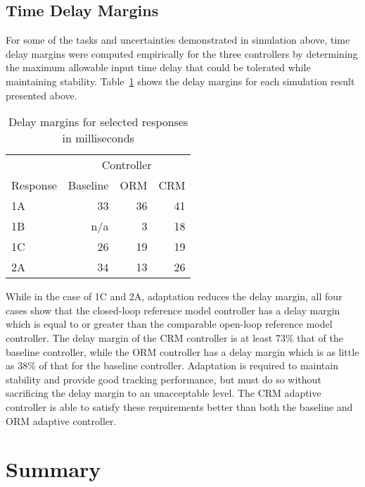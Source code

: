 \subsection{Time Delay Margins}

For some of the tasks and uncertainties demonstrated in simulation above, time delay margins were computed empirically for the three controllers by determining the maximum allowable input time delay that could be tolerated while maintaining stability.
Table~\ref{tab:delaymargins} shows the delay margins for each simulation result presented above.

\begin{table}[H]
  \centering
  \caption{Delay margins for selected responses in milliseconds\label{tab:delaymargins}}
  \small
  \begin{tabular}{lrrr}
    \toprule
    &\multicolumn{3}{c}{Controller} \\
    Response & Baseline & ORM & CRM \\
    \midrule
    1A & 33 & 36 & 41 \\
    1B & n/a & 3 & 18 \\
    1C & 26 & 19 & 19 \\
    2A & 34 & 13 & 26 \\
    \bottomrule
  \end{tabular}
\end{table}

While in the case of 1C and 2A, adaptation reduces the delay margin, all four cases show that the closed-loop reference model controller has a delay margin which is equal to or greater than the comparable open-loop reference model controller.
The delay margin of the CRM controller is at least 73\% that of the baseline controller, while the ORM controller has a delay margin which is as little as 38\% of that for the baseline controller.
Adaptation is required to maintain stability and provide good tracking performance, but must do so without sacrificing the delay margin to an unacceptable level.
The CRM adaptive controller is able to satisfy these requirements better than both the baseline and ORM adaptive controller.

\section{Summary}

